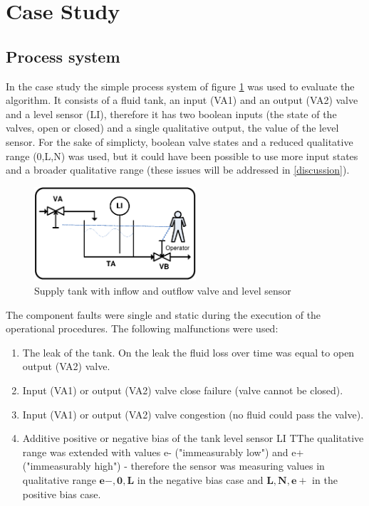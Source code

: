 \documentclass[conference]{IEEEtran}
\begin{document}
\section{Case Study}

\subsection{Process system}
\label{ref:procsys}

In the case study the simple process system of figure \ref{fig:tank} was used to evaluate the algorithm. It consists of a fluid tank, an input (VA1) and an output (VA2) valve and a level sensor (LI), therefore it has two boolean inputs (the state of the valves, open or closed) and a single qualitative output, the value of the level sensor. For the sake of simplicty, boolean valve states and a reduced qualitative range ({0,L,N}) was used, but it could have been possible to use more input states and a broader qualitative range (these issues will be addressed in \ref{discussion}). 

\begin{figure}[h!]
 \begin{center}
  \includegraphics[width=6cm]{Stank.eps}
  \caption {Supply tank with inflow and outflow valve and level sensor}
  \label{fig:tank}
 \end{center}
\end{figure} 

The component faults were single and static during the execution of the operational procedures. The following malfunctions were used:
\begin{enumerate}
\item The leak of the tank. On the leak the fluid loss over time was equal to open output (VA2) valve.
\item Input (VA1) or output (VA2) valve close failure (valve cannot be closed).
\item Input (VA1) or output (VA2) valve congestion (no fluid could pass the valve).
\item Additive positive or negative bias of the tank level sensor LI TThe qualitative range was extended with values e- ("immeasurably low") and e+("immeasurably high") - therefore the sensor was measuring values in qualitative range $\mathbf{e-,0,L}$ in the negative bias case and $\mathbf{L,N,e+}$ in the positive bias case.
\end{enumerate}
\end{document}
